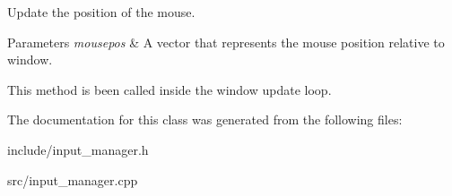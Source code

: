 Update the position of the mouse. 


\begin{DoxyParams}{Parameters}
{\em mousepos} & A vector that represents the mouse position relative to window.\\
\hline
\end{DoxyParams}
This method is been called inside the window update loop. 

The documentation for this class was generated from the following files\+:\begin{DoxyCompactItemize}
\item 
include/input\+\_\+manager.\+h\item 
src/input\+\_\+manager.\+cpp\end{DoxyCompactItemize}
